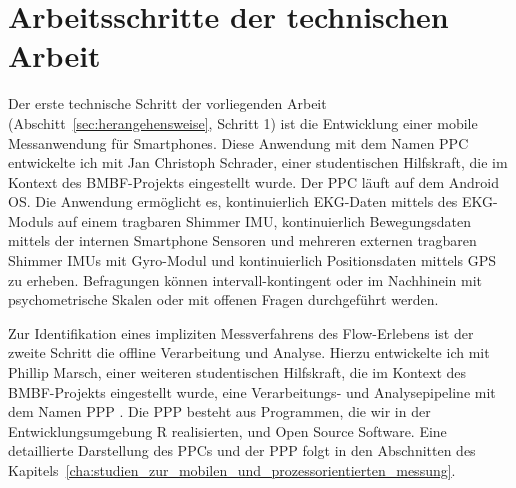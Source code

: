 

\section{Arbeitsschritte der technischen Arbeit} 

\label{sec:arbeitsschritte_der_technischen_arbeit}

Der erste technische Schritt der vorliegenden Arbeit (Abschitt~\ref{sec:herangehensweise}, Schritt 1) ist die Entwicklung einer mobile Messanwendung für Smartphones. Diese Anwendung mit dem Namen \ac{PPC} \citep{Bogutzky2016} entwickelte ich mit Jan Christoph Schrader, einer studentischen Hilfskraft, die im Kontext des \acs{BMBF}-Projekts eingestellt wurde. Der \ac{PPC} läuft auf dem Android OS. Die Anwendung ermöglicht es, kontinuierlich \ac{EKG}-Daten mittels des \ac{EKG}-Moduls auf einem tragbaren Shimmer \ac{IMU}, kontinuierlich Bewegungsdaten mittels der internen Smartphone Sensoren und mehreren externen tragbaren Shimmer \ac{IMU}s mit Gyro-Modul und kontinuierlich Positionsdaten mittels \ac{GPS} zu erheben. Befragungen können intervall-kontingent oder im Nachhinein mit psychometrische Skalen oder mit offenen Fragen durchgeführt werden.

Zur Identifikation eines impliziten Messverfahrens des Flow-Erlebens ist der zweite Schritt die offline Verarbeitung und Analyse. Hierzu entwickelte ich mit Phillip Marsch, einer weiteren studentischen Hilfskraft, die im Kontext des \acs{BMBF}-Projekts eingestellt wurde, eine Verarbeitungs- und Analysepipeline mit dem Namen \ac{PPP} \citep{Bogutzky2016a}. Die \ac{PPP} besteht aus Programmen, die wir in der Entwicklungsumgebung R realisierten, und Open Source Software. Eine detaillierte Darstellung des \ac{PPC}s und der \ac{PPP} folgt in den Abschnitten des Kapitels~\ref{cha:studien_zur_mobilen_und_prozessorientierten_messung}.


